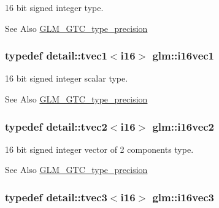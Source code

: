 16 bit signed integer type. 

\begin{DoxySeeAlso}{See Also}
\hyperlink{group__gtc__type__precision}{G\-L\-M\-\_\-\-G\-T\-C\-\_\-type\-\_\-precision} 
\end{DoxySeeAlso}
\hypertarget{group__gtc__type__precision_ga95c6d9b5d9d140fad7405496484ec622}{
\subsubsection[{i16vec1}]{\setlength{\rightskip}{0pt plus 5cm}typedef detail\-::tvec1$<$i16$>$ {\bf glm\-::i16vec1}}}\label{group__gtc__type__precision_ga95c6d9b5d9d140fad7405496484ec622}


16 bit signed integer scalar type. 

\begin{DoxySeeAlso}{See Also}
\hyperlink{group__gtc__type__precision}{G\-L\-M\-\_\-\-G\-T\-C\-\_\-type\-\_\-precision} 
\end{DoxySeeAlso}
\hypertarget{group__gtc__type__precision_gae6b6e6aecc629c6ba90ab75d2a555cdd}{
\subsubsection[{i16vec2}]{\setlength{\rightskip}{0pt plus 5cm}typedef detail\-::tvec2$<$i16$>$ {\bf glm\-::i16vec2}}}\label{group__gtc__type__precision_gae6b6e6aecc629c6ba90ab75d2a555cdd}


16 bit signed integer vector of 2 components type. 

\begin{DoxySeeAlso}{See Also}
\hyperlink{group__gtc__type__precision}{G\-L\-M\-\_\-\-G\-T\-C\-\_\-type\-\_\-precision} 
\end{DoxySeeAlso}
\hypertarget{group__gtc__type__precision_ga431a95adcef90192c0c0f1a6fc05ab4e}{
\subsubsection[{i16vec3}]{\setlength{\rightskip}{0pt plus 5cm}typedef detail\-::tvec3$<$i16$>$ {\bf glm\-::i16vec3}}}\label{group__gtc__type__precision_ga431a95adcef90192c0c0f1a6fc05ab4e}


